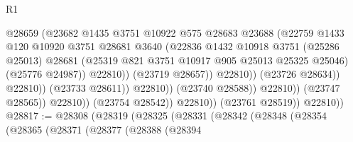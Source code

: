 \begin{lexlean}{R1}
\begin{coremodule}
                                              @28659
                                              (@23682
                                                @1435
                                                @3751
                                                @10922
                                                @575
                                                @28683
                                                @23688
                                                (@22759
                                                  @1433
                                                  @120
                                                  @10920
                                                  @3751
                                                  @28681
                                                  @3640
                                                  (@22836
                                                    @1432
                                                    @10918
                                                    @3751
                                                    (@25286 @25013)
                                                    @28681
                                                    (@25319
                                                      @821
                                                      @3751
                                                      @10917
                                                      @905
                                                      @25013
                                                      @25325
                                                      @25046)
                                                    (@25776 @24987))
                                                  @22810))
                                              (@23719 @28657))
                                            @22810))
                                        (@23726 @28634))
                                      @22810))
                                  (@23733 @28611))
                                @22810))
                            (@23740 @28588))
                          @22810))
                      (@23747 @28565))
                    @22810))
                (@23754 @28542))
              @22810))
          (@23761 @28519))
        @22810))
@28817 := @28308
    (@28319
      (@28325
        (@28331
          (@28342
            (@28348
              (@28354
                (@28365
                  (@28371
                    (@28377
                      (@28388
                        (@28394

\end{coremodule}
\end{lexlean}
